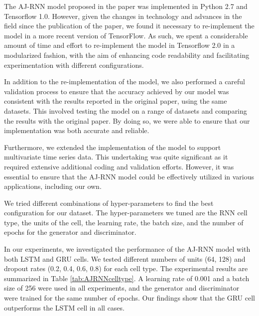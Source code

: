The AJ-RNN model proposed in the paper was implemented in Python 2.7 and Tensorflow 1.0.
However, given the changes in technology and advances in the field since the publication of the paper, we found it necessary to re-implement the model in a more recent version of TensorFlow.
As such, we spent a considerable amount of time and effort to re-implement the model in Tensorflow 2.0 in a modularized fashion, with the aim of enhancing code readability and facilitating experimentation with different configurations.

In addition to the re-implementation of the model, we also performed a careful validation process to ensure that the accuracy achieved by our model was consistent with the results reported in the original paper, using the same datasets. 
This involved testing the model on a range of datasets and comparing the results with the original paper. 
By doing so, we were able to ensure that our implementation was both accurate and reliable.

Furthermore, we extended the implementation of the model to support multivariate time series data. 
This undertaking was quite significant as it required extensive additional coding and validation efforts. 
However, it was essential to ensure that the AJ-RNN model could be effectively utilized in various applications, including our own.


We tried different combinations of hyper-parameters to find the best configuration for our dataset.
The hyper-parameters we tuned are the RNN cell type, the units of the cell, the learning rate, the batch size, and the number of epochs for the generator and discriminator.

In our experiments, we investigated the performance of the AJ-RNN model with both LSTM and GRU cells. 
We tested different numbers of units (64, 128) and dropout rates (0.2, 0.4, 0.6, 0.8) for each cell type. 
The experimental results are summarized in Table \ref{tab:AJRNNcelltype}. 
A learning rate of 0.001 and a batch size of 256 were used in all experiments, and the generator and discriminator were trained for the same number of epochs. 
Our findings show that the GRU cell outperforms the LSTM cell in all cases.

